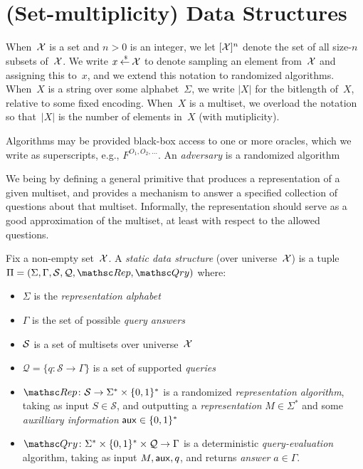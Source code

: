\section{(Set-multiplicity) Data Structures}
\def\pub{{\sf pub}}
\def\aux{{\sf aux}}

When~${\cal X}$ is a set and $n>0$ is an integer, we let $[{\cal X}]^n$ denote the set of all size-$n$ subsets of~${\cal X}$. We write $x {\:\stackrel{{\scriptscriptstyle \hspace{0.2em}\$}} {\leftarrow}\:} {\cal X}$ to denote sampling an element from~${\cal X}$ and assigning this to~$x$, and we extend this notation to randomized algorithms.  When~$X$ is a string over some alphabet~$\Sigma$, we write $|X|$ for the bitlength of~$X$, relative to some fixed encoding.  When~$X$ is a multiset, we overload the notation so that~$|X|$ is the number of elements in~$X$ (with mutiplicity).

Algorithms may be provided black-box access to one or more oracles, which we write as superscripts, e.g., $F^{O_1,O_2,\ldots}$.  An \emph{adversary} is a randomized algorithm

  We being by defining a general primitive that produces a representation of a given multiset, and provides a mechanism to answer a specified collection of questions about that multiset.  Informally, the representation should serve as a good approximation of the multiset, at least with respect to the allowed questions.
\begin{definition} \rm
Fix a non-empty set~${\cal X}$. A \emph{static data structure} (over universe~${\cal X}$)
is a tuple $\setprim=(\Sigma,\Gamma,\calS,\calQ,\Rep, \Qry)$ where:
\begin{itemize}
\item $\Sigma$ is the \emph{representation alphabet}
\item $\Gamma$ is the set of possible \emph{query answers}
\item ${\cal S}$ is a set  of multisets over universe~${\cal X}$
\item $\mathcal{Q}=\{q \colon \mathcal{S} \to \Gamma\}$ is a set of supported \emph{queries}
\item $\Rep \colon \mathcal{S} \to \Sigma^* \times \bits^*$ is a randomized \emph{representation algorithm}, taking as input $S \in \mathcal{S}$, and outputting a \emph{representation} $M \in \Sigma^*$ and some \emph{auxilliary information} $\aux \in \bits^*$
\item $\Qry\colon \Sigma^* \times \bits^* \times \calQ \to \Gamma$ is a deterministic \emph{query-evaluation} algorithm, taking as input $M, \aux, q$, and returns \emph{answer} $a \in \Gamma$.
\end{itemize}
\hfill\dqed
\end{definition}

